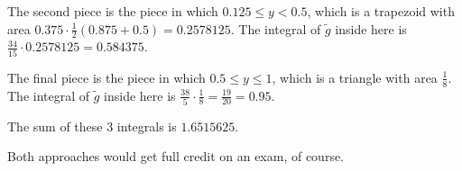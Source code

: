 \begin{solution}
  The second piece is the piece in which $0.125\leq y<0.5$, which is a trapezoid with area $0.375\cdot\frac12(0.875+0.5)=0.2578125$. The integral of $\widetilde g$ inside here is $\frac{34}{15}\cdot0.2578125=0.584375$.

  The final piece is the piece in which $0.5\leq y\leq 1$, which is a triangle with area $\frac18$. The integral of $\widetilde g$ inside here is $\frac{38}5\cdot \frac18=\frac{19}{20}=0.95$.

  The sum of these 3 integrals is $1.6515625$.

  Both approaches would get full credit on an exam, of course.
\end{solution}



